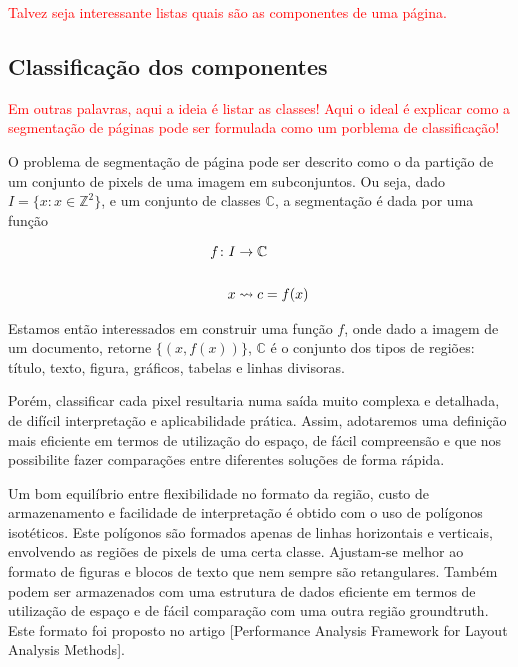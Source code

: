 \documentclass[a4paper,11pt]{article}
\newcommand{\TODO}[1]{\textcolor{red}{#1}}
\begin{document}
\TODO{Talvez seja interessante listas quais são as componentes de uma
página.}


\subsection{Classificação dos componentes}

\TODO{Em outras palavras, aqui a ideia é listar as classes!}
\TODO{Aqui o ideal é explicar como a segmentação de páginas pode ser
  formulada como um porblema de classificação!}


O problema de segmentação de página pode ser descrito como o da
partição de um conjunto de pixels de uma imagem em subconjuntos. Ou
seja, dado $I = \lbrace x \colon x \in \mathbb{Z} ^ 2 \rbrace$, e um
conjunto de classes $\mathbb{C}$, a segmentação é dada por uma função

    \begin{equation}
      \begin{split}
        f \colon I &\to \mathbb{C}\\
        \cr x &\rightsquigarrow c = f(x)
      \end{split}
    \end{equation}


    Estamos então interessados em construir uma função $f$, onde dado
    a imagem de um documento, retorne $\lbrace (x, f(x)) \rbrace$,
    $\mathbb{C}$ é o conjunto dos tipos de regiões: título, texto,
    figura, gráficos, tabelas e linhas divisoras.

    Porém, classificar cada pixel resultaria numa saída muito complexa
    e detalhada, de difícil interpretação e aplicabilidade
    prática. Assim, adotaremos uma definição mais eficiente em termos
    de utilização do espaço, de fácil compreensão e que nos
    possibilite fazer comparações entre diferentes soluções de forma
    rápida.


    Um bom equilíbrio entre flexibilidade no formato da região, custo
    de armazenamento e facilidade de interpretação é obtido com o uso
    de polígonos isotéticos. Este polígonos são formados apenas de
    linhas horizontais e verticais, envolvendo as regiões de pixels de
    uma certa classe. Ajustam-se melhor ao formato de figuras e blocos
    de texto que nem sempre são retangulares. Também podem ser
    armazenados com uma estrutura de dados eficiente em termos de
    utilização de espaço e de fácil comparação com uma outra região
    groundtruth. Este formato foi proposto no artigo [Performance
      Analysis Framework for Layout Analysis Methods].
\end{document}
